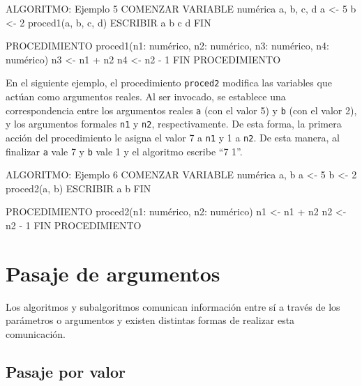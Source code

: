 \documentclass[
]{book}
\newenvironment{Shaded}{\begin{snugshade}}{\end{snugshade}}
\newcommand{\NormalTok}[1]{#1}
\begin{document}
\begin{Shaded}
\begin{Highlighting}[]
\NormalTok{ALGORITMO: Ejemplo 5}
\NormalTok{COMENZAR}
\NormalTok{    VARIABLE numérica a, b, c, d}
\NormalTok{    a \textless{}{-} 5}
\NormalTok{    b \textless{}{-} 2}
\NormalTok{    proced1(a, b, c, d)}
\NormalTok{    ESCRIBIR a b c d}
\NormalTok{FIN}

\NormalTok{PROCEDIMIENTO proced1(n1: numérico, n2: numérico, n3: numérico, n4: numérico)}
\NormalTok{    n3 \textless{}{-} n1 + n2}
\NormalTok{    n4 \textless{}{-} n2 {-} 1}
\NormalTok{FIN PROCEDIMIENTO}
\end{Highlighting}
\end{Shaded}

En el siguiente ejemplo, el procedimiento \texttt{proced2} modifica las variables que actúan como argumentos reales. Al ser invocado, se establece una correspondencia entre los argumentos reales \texttt{a} (con el valor 5) y \texttt{b} (con el valor 2), y los argumentos formales \texttt{n1} y \texttt{n2}, respectivamente. De esta forma, la primera acción del procedimiento le asigna el valor 7 a \texttt{n1} y 1 a \texttt{n2}. De esta manera, al finalizar \texttt{a} vale 7 y \texttt{b} vale 1 y el algoritmo escribe ``7 1''.

\begin{Shaded}
\begin{Highlighting}[]
\NormalTok{ALGORITMO: Ejemplo 6}
\NormalTok{COMENZAR}
\NormalTok{    VARIABLE numérica a, b}
\NormalTok{    a \textless{}{-} 5}
\NormalTok{    b \textless{}{-} 2}
\NormalTok{    proced2(a, b)}
\NormalTok{    ESCRIBIR a b}
\NormalTok{FIN}

\NormalTok{PROCEDIMIENTO proced2(n1: numérico, n2: numérico)}
\NormalTok{    n1 \textless{}{-} n1 + n2}
\NormalTok{    n2 \textless{}{-} n2 {-} 1}
\NormalTok{FIN PROCEDIMIENTO}
\end{Highlighting}
\end{Shaded}

\hypertarget{pasaje-de-argumentos}{%
\section{Pasaje de argumentos}\label{pasaje-de-argumentos}}

Los algoritmos y subalgoritmos comunican información entre sí a través de los parámetros o argumentos y existen distintas formas de realizar esta comunicación.

\hypertarget{pasaje-por-valor}{%
\subsection{Pasaje por valor}\label{pasaje-por-valor}}
\end{document}
